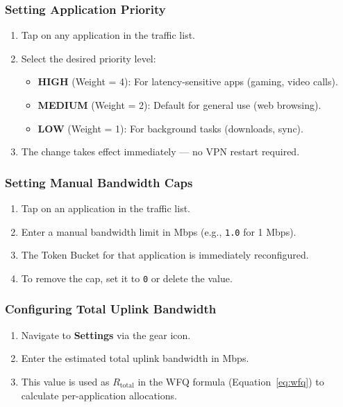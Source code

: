 \subsubsection{Setting Application Priority}

\begin{enumerate}
    \item Tap on any application in the traffic list.
    \item Select the desired priority level:
    \begin{itemize}
        \item \textbf{HIGH} (Weight = 4): For latency-sensitive apps (gaming, video calls).
        \item \textbf{MEDIUM} (Weight = 2): Default for general use (web browsing).
        \item \textbf{LOW} (Weight = 1): For background tasks (downloads, sync).
    \end{itemize}
    \item The change takes effect immediately --- no VPN restart required.
\end{enumerate}

\subsubsection{Setting Manual Bandwidth Caps}

\begin{enumerate}
    \item Tap on an application in the traffic list.
    \item Enter a manual bandwidth limit in Mbps (e.g., \texttt{1.0} for 1 Mbps).
    \item The Token Bucket for that application is immediately reconfigured.
    \item To remove the cap, set it to \texttt{0} or delete the value.
\end{enumerate}

\subsubsection{Configuring Total Uplink Bandwidth}

\begin{enumerate}
    \item Navigate to \textbf{Settings} via the gear icon.
    \item Enter the estimated total uplink bandwidth in Mbps.
    \item This value is used as $R_{\text{total}}$ in the WFQ formula (Equation~\ref{eq:wfq}) to calculate per-application allocations.
\end{enumerate}


